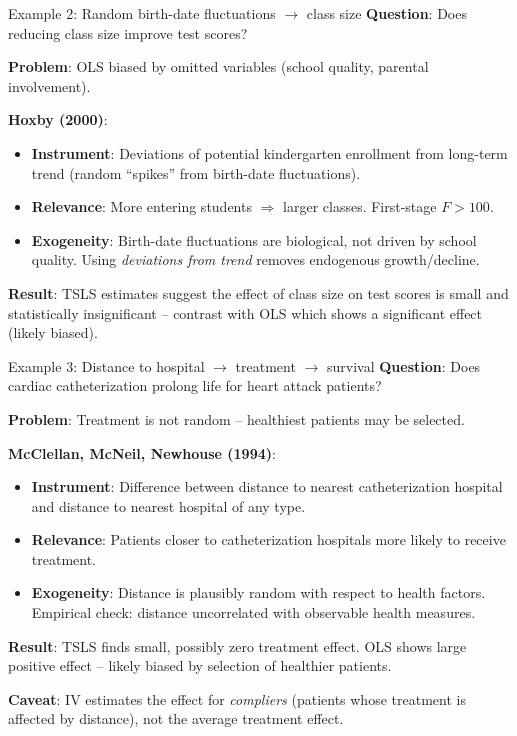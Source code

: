 \documentclass[10pt]{beamer}
\begin{document}
\begin{frame}{Example 2: Random birth-date fluctuations $\to$ class size}
\label{slide:hoxby}
\textbf{Question}: Does reducing class size improve test scores?

\textbf{Problem}: OLS biased by omitted variables (school quality, parental involvement).

\pause
\vspace{0.3em}
\textbf{Hoxby (2000)}:
\begin{itemize}
  \item \textbf{Instrument}: Deviations of potential kindergarten enrollment from long-term trend (random ``spikes'' from birth-date fluctuations).
  \item \textbf{Relevance}: More entering students $\Rightarrow$ larger classes. First-stage $F > 100$.
  \item \textbf{Exogeneity}: Birth-date fluctuations are biological, not driven by school quality. Using \emph{deviations from trend} removes endogenous growth/decline.
\end{itemize}

\pause
\vspace{0.3em}
\textbf{Result}: TSLS estimates suggest the effect of class size on test scores is \alert{small and statistically insignificant} -- contrast with OLS which shows a significant effect (likely biased).
\end{frame}

\begin{frame}{Example 3: Distance to hospital $\to$ treatment $\to$ survival}
\label{slide:mcclellan}
\textbf{Question}: Does cardiac catheterization prolong life for heart attack patients?

\textbf{Problem}: Treatment is not random -- healthiest patients may be selected.

\pause
\vspace{0.3em}
\textbf{McClellan, McNeil, Newhouse (1994)}:
\begin{itemize}
  \item \textbf{Instrument}: Difference between distance to nearest catheterization hospital and distance to nearest hospital of any type.
  \item \textbf{Relevance}: Patients closer to catheterization hospitals more likely to receive treatment.
  \item \textbf{Exogeneity}: Distance is plausibly random with respect to health factors. Empirical check: distance uncorrelated with observable health measures.
\end{itemize}

\pause
\vspace{0.3em}
\textbf{Result}: TSLS finds \alert{small, possibly zero} treatment effect. OLS shows large positive effect -- likely biased by selection of healthier patients.

\vspace{0.3em}
\textbf{Caveat}: IV estimates the effect for \emph{compliers} (patients whose treatment is affected by distance), not the average treatment effect.
\end{frame}
\end{document}
